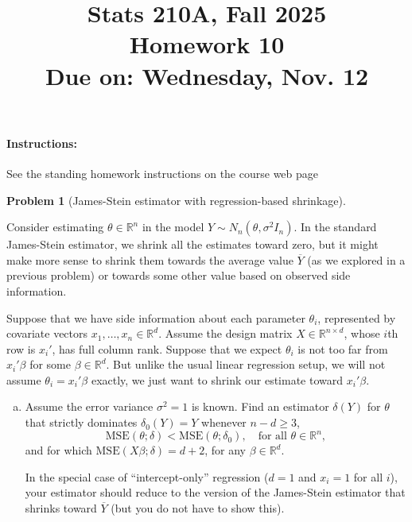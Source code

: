 \documentclass{article}
\newcommand{\RR}{\mathbb{R}}
\theoremstyle{definition}
\newtheorem{problem}{Problem}
\begin{document}
\title{Stats 210A, Fall 2025\\
  Homework 10 \\
  {\large {\bf Due on}: Wednesday, Nov. 12}}
\date{}

\maketitle

\paragraph{Instructions:} See the standing homework instructions on the course web page


\begin{problem}[James-Stein estimator with regression-based shrinkage]
\label{prob:js-regression}

Consider estimating $\theta \in \RR^n$ in the model $Y \sim N_n(\theta, \sigma^2 I_n)$. In the standard James-Stein estimator, we shrink all the estimates toward zero, but it might make more sense to shrink them towards the average value $\overline{Y}$ (as we explored in a previous problem) or towards some other value based on observed side information.

Suppose that we have side information about each parameter $\theta_i$, represented by covariate vectors $x_1,\ldots,x_n \in \RR^d$. Assume the design matrix $X \in \RR^{n\times d}$, whose $i$th row is $x_i'$, has full column rank. Suppose that we expect $\theta_i$ is not too far from $x_i'\beta$ for some $\beta\in \RR^d$. But unlike the usual linear regression setup, we will not assume $\theta_i = x_i'\beta$ exactly, we just want to shrink our estimate toward $x_i'\beta$.

\begin{enumerate}[(a)]

\item Assume the error variance $\sigma^2 = 1$ is known. Find an estimator $\delta(Y)$ for $\theta$ that strictly dominates $\delta_0(Y) = Y$ whenever $n - d \geq 3$,
\[
\text{MSE}(\theta; \delta) < \text{MSE}(\theta; \delta_0), \quad \text{for all } \theta \in \RR^n,
\]
and for which $\text{MSE}(X\beta; \delta) = d + 2$, for any $\beta\in \RR^d$.

In the special case of ``intercept-only'' regression ($d=1$ and $x_i=1$ for all $i$), your estimator should reduce to the version of the James-Stein estimator that shrinks toward $\overline{Y}$ (but you do not have to show this).


\end{enumerate}
\end{problem}
\end{document}
